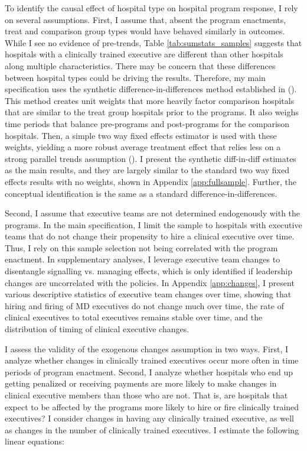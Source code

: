 \documentclass[12pt]{article}
\begin{document}
    To identify the causal effect of hospital type on hospital program response, I rely on several assumptions. First, I assume that, absent the program enactments, treat and comparison group types would have behaved similarly in outcomes. While I see no evidence of pre-trends, Table \ref{tab:sumstats_samples} suggests that hospitals with a clinically trained executive are different than other hospitals along multiple characteristics. There may be concern that these differences between hospital types could be driving the results. Therefore, my main specification uses the synthetic difference-in-differences method established in \citeauthor{arkhangelsky2021synthetic} (\citeyear{arkhangelsky2021synthetic}). This method creates unit weights that more heavily factor comparison hospitals that are similar to the treat group hospitals prior to the programs. It also weighs time periods that balance pre-programs and post-programs for the comparison hospitals. Then, a simple two way fixed effects estimator is used with these weights, yielding a more robust average treatment effect that relies less on a strong parallel trends assumption (\cite{arkhangelsky2021synthetic}). I present the synthetic diff-in-diff estimates as the main results, and they are largely similar to the standard two way fixed effects results with no weights, shown in Appendix \ref{app:fullsample}. Further, the conceptual identification is the same as a standard difference-in-differences.

     Second, I assume that executive teams are not determined endogenously with the programs. In the main specification, I limit the sample to hospitals with executive teams that do not change their propensity to hire a clinical executive over time. Thus, I rely on this sample selection not being correlated with the program enactment. In supplementary analyses, I leverage executive team changes to disentangle signalling vs. managing effects, which is only identified if leadership changes are uncorrelated with the policies. In Appendix \ref{app:changes}, I present various descriptive statistics of executive team changes over time, showing that hiring and firing of MD executives do not change much over time, the rate of clinical executives to total executives remains stable over time, and the distribution of timing of clinical executive changes. 

     I assess the validity of the exogenous changes assumption in two ways. First, I analyze whether changes in clinically trained executives occur more often in time periods of program enactment. Second, I analyze whether hospitals who end up getting penalized or receiving payments are more likely to make changes in clinical executive members than those who are not. That is, are hospitals that expect to be affected by the programs more likely to hire or fire clinically trained executives? I consider changes in having any clinically trained executive, as well as changes in the number of clinically trained executives. I estimate the following linear equations:
\end{document}
